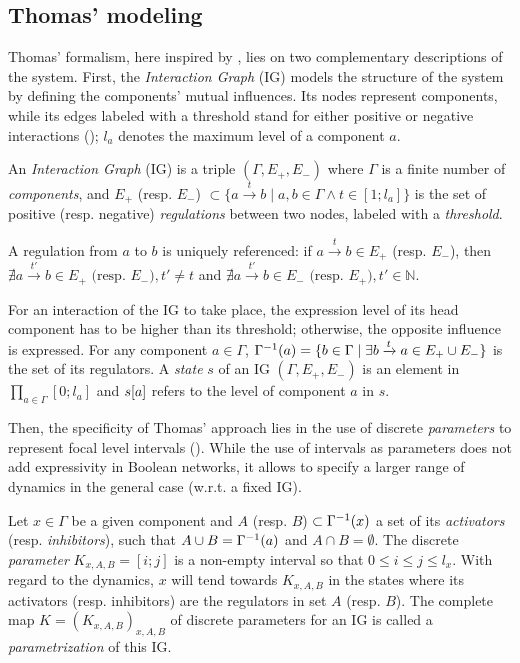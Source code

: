\subsection{Thomas' modeling}
Thomas' formalism, here inspired by \cite{Richard06,BernotSemBRN}, lies on two complementary descriptions of the system.
First, the \emph{Interaction Graph} (IG) models the structure of the system by defining the components' mutual influences.
Its nodes represent components, while its edges labeled with a threshold stand for either positive or negative interactions ();
$l_a$ denotes the maximum level of a component $a$.

\begin{definition}
\label{def:ig}
An \emph{Interaction Graph} (IG) is a triple $(\Gamma, E_+, E_-)$ where $\Gamma$ is a finite number of \emph{components},
and $E_+$ (resp. $E_-$) $\subset \{a \xrightarrow{t} b \mid a, b \in \Gamma \wedge t \in [1; l_a]\}$
is the set of positive (resp. negative) \emph{regulations} between two nodes, labeled with a \emph{threshold}.

A regulation from $a$ to $b$ is uniquely referenced:
if $a \xrightarrow{t} b \in E_+$ (resp. $E_-$),
then $\nexists a \xrightarrow{t'} b \in E_+ \text{ (resp. $E_-$)}, t' \neq t$
and $\nexists a \xrightarrow{t'} b \in E_-\text{ (resp. $E_+$)}, t' \in \mathbb{N}$.
\end{definition}

\noindent
For an interaction of the IG to take place, the expression level of its head component has to be higher than its threshold; otherwise, the opposite influence is expressed.
For any component $a \in \Gamma$, $\Gamma^{-1}(a) = \{ b\in\Gamma\mid \exists b\xrightarrow t a\in E_+\cup E_- \}$
is the set of its regulators.
A \emph{state} $s$ of an IG $(\Gamma, E_+, E_-)$ is an element in $\prod_{a \in \Gamma} [0;l_a]$
and ${s[a]}$ refers to the level of component $a$ in $s$.

Then, the specificity of Thomas' approach lies in the use of discrete \emph{parameters} to represent focal level intervals ().
While the use of intervals as parameters does not add expressivity in Boolean networks, it allows to specify a larger range of dynamics in the general case (w.r.t. a fixed IG).

\begin{definition}\label{def:param}
Let $x \in \Gamma$ be a given component and $A$ (resp. $B$) $\subset \Gamma^{-1}(x)$ a set of its \emph{activators} (resp. \emph{inhibitors}),
such that $A \cup B = \Gamma^{-1}(a)$ and $A \cap B = \emptyset$.
The discrete \emph{parameter} $K_{x,A,B} = [i; j]$ is a non-empty interval so that $0 \leq i \leq j \leq l_x$.
With regard to the dynamics, $x$ will tend towards $K_{x,A,B}$ in the states where its activators (resp. inhibitors) are the regulators in set $A$ (resp. $B$).
The complete map $K = (K_{x,A,B})_{x,A,B}$ of discrete parameters for an IG is called a \emph{parametrization} of this IG.
\end{definition}

